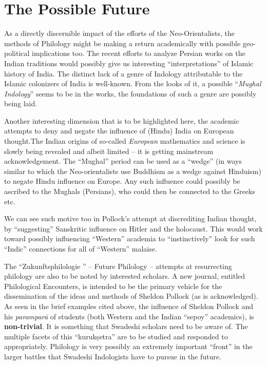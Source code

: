 \vskip -6pt


\section*{The Possible Future}

\vskip -6pt

As a directly discernible impact of the efforts of the Neo-Orientalists, the methods of Philology might be making a return academically with possible geo-political implications too. The recent efforts to analyze Persian works on the Indian traditions would possibly give us interesting “interpretations” of Islamic history of India. The distinct lack of a genre of Indology attributable to the Islamic colonizers of India is well-known. From the looks of it, a possible “\textit{Mughal Indology}” seems to be in the works, the foundations of such a genre are possibly being laid.

Another interesting dimension that is to be highlighted here, the academic attempts to deny and negate the influence of (Hindu) India on European thought.The Indian origins of so-called \textit{European} mathematics and science is slowly being revealed and albeit limited – it is getting mainstream acknowledgement. The “Mughal” period can be used as a “wedge” (in ways similar to which the Neo-orientalists use Buddhism as a wedge against Hinduism) to negate Hindu influence on Europe. Any such influence could possibly be ascribed to the Mughals (Persians), who could then be connected to the Greeks etc.

We can see such motive too in Pollock’s attempt at discrediting Indian thought, by “suggesting” Sanskritic influence on Hitler and the holocaust. This would work toward possibly influencing “Western” academia to “instinctively” look for such “Indic” connections for all of “Western” malaise. 

The “Zukunftsphilologie ” – Future Philology – attempts at resurrecting philology are also to be noted by interested scholars. A new journal, entitled Philological Encounters, is intended to be the primary vehicle for the dissemination of the ideas and methods of Sheldon Pollock (as is acknowledged). As seen in the brief examples cited above, the influence of Sheldon Pollock and his \textit{paramparā} of students (both Western and the Indian “sepoy” academics), is \textbf{non-trivial}. It is something that Swadeshi scholars need to be aware of. The multiple facets of this “kurukṣetra” are to be studied and responded to appropriately. Philology is very possibly an extremely important “front” in the larger battles that Swadeshi Indologists have to pursue in the future.

